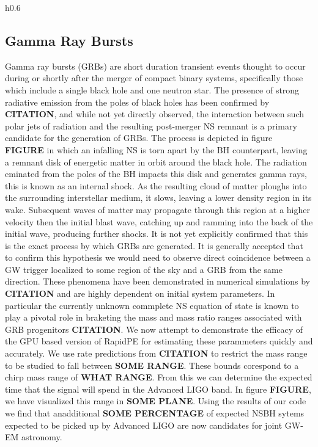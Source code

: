 \documentclass[paper=a4, fontsize=11pt]{scrartcl} %
\numberwithin{equation}{section} %
\numberwithin{figure}{section} %
\numberwithin{table}{section} %
\begin{document}
\begin{wrapfigure}{h}{0.6\textwidth}
\subsection{Gamma Ray Bursts}
Gamma ray bursts (GRBs) are short duration transient events thought to occur during or shortly after the merger of compact binary systems, specifically those which include a single black hole and one neutron star. The presence of strong radiative emission from the poles of black holes has been confirmed by \textbf{CITATION}, and while not yet directly observed, the interaction between such polar jets of radiation and the resulting post-merger NS remnant is a primary candidate for the generation of GRBs. The process is depicted in figure \textbf{FIGURE} in which an infalling NS is torn apart by the BH counterpart, leaving a remnant disk of energetic matter in orbit around the black hole. The radiation eminated from the poles of the BH impacts this disk and generates gamma rays, this is known as an internal shock. As the resulting cloud of matter ploughs into the surrounding interstellar medium, it slows, leaving a lower density region in its wake. Subsequent waves of matter may propagate through this region at a higher velocity then the initial blast wave, catching up and ramming into the back of the initial wave, producing further shocks.
It is not yet explicitly confirmed that this is the exact process by which GRBs are generated. It is generally accepted that to confirm this hypothesis we would need to observe direct coincidence between a GW trigger localized to some region of the sky and a GRB from the same direction. These phenomena have been demonstrated in numerical simulations by \textbf{CITATION} and are highly dependent on initial system parameters. In particular the currently unknown commplete NS equation of state is known to play a pivotal role in braketing the mass and mass ratio ranges associated with GRB progenitors \textbf{CITATION}. We now attempt to demonstrate the efficacy of the GPU based version of RapidPE for estimating these parammeters quickly and accurately. We use rate predictions from \textbf{CITATION} to restrict the mass range to be studied to fall between \textbf{SOME RANGE}. These bounds corespond to a chirp mass range of \textbf{WHAT RANGE}. From this we can determine the expected time that the signal will spend in the Advanced LIGO band. In figure \textbf{FIGURE}, we have visualized this range in \textbf{SOME PLANE}. Using the results of our code we find that anadditional \textbf{SOME PERCENTAGE} of expected NSBH sytems expected to be picked up by Advanced LIGO are now candidates for joint GW-EM astronomy.


\end{wrapfigure}
\end{document}
